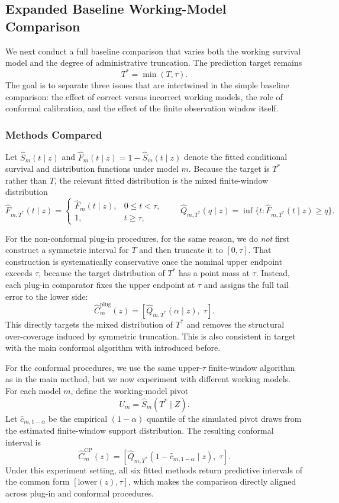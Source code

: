 \documentclass[12pt]{article}
\makeatletter
\let\thesis@section\subsection
\let\thesis@subsection\subsubsection
\renewcommand{\section}{\thesis@section}
\renewcommand{\subsection}{\thesis@subsection}
\makeatother
\begin{document}
\section{\texorpdfstring{\textcolor{revisionblue}{Expanded Baseline Working-Model Comparison}}{Expanded Baseline Working-Model Comparison}}
\label{sec:expanded_baseline_comparison}
{\color{revisionblue}
We next conduct a full baseline comparison that varies both the working survival model and the degree of administrative truncation. The prediction target remains
\[
T^*=\min(T,\tau).
\]
The goal is to separate three issues that are intertwined in the simple baseline comparison: the effect of correct versus incorrect working models, the role of conformal calibration, and the effect of the finite observation window itself.

\subsection{Methods Compared}
Let $\widehat S_m(t\mid z)$ and $\widehat F_m(t\mid z)=1-\widehat S_m(t\mid z)$ denote the fitted conditional survival and distribution functions under model $m$. Because the target is $T^*$ rather than $T$, the relevant fitted distribution is the mixed finite-window distribution
\[
\widehat F_{m,T^*}(t\mid z)
=
\begin{cases}
\widehat F_m(t\mid z), & 0\le t<\tau,\\
1, & t\ge \tau,
\end{cases}
\qquad
\widehat Q_{m,T^*}(q\mid z)
=
\inf\{t:\widehat F_{m,T^*}(t\mid z)\ge q\}.
\]

For the non-conformal plug-in procedures, for the same reason, we do \emph{not} first construct a symmetric interval for $T$ and then truncate it to $[0,\tau]$. That construction is systematically conservative once the nominal upper endpoint exceeds $\tau$, because the target distribution of $T^*$ has a point mass at $\tau$. Instead, each plug-in comparator fixes the upper endpoint at $\tau$ and assigns the full tail error to the lower side:
\[
\widehat C_m^{\mathrm{plug}}(z)
=
\left[
\widehat Q_{m,T^*}(\alpha\mid z),\;
\tau
\right].
\]
This directly targets the mixed distribution of $T^*$ and removes the structural over-coverage induced by symmetric truncation. This is also consistent in target with the main conformal algorithm with introduced before.

For the conformal procedures, we use the same upper-$\tau$ finite-window algorithm as in the main method, but we now experiment with different working models. For each model $m$, define the working-model pivot
\[
U_m=\widehat S_m(T^*\mid Z).
\]
Let $\widehat c_{m,1-\alpha}$ be the empirical $(1-\alpha)$ quantile of the simulated pivot draws from the estimated finite-window support distribution. The resulting conformal interval is
\[
\widehat C_m^{\mathrm{CP}}(z)
=
\left[
\widehat Q_{m,T^*}(1-\widehat c_{m,1-\alpha}\mid z),\;
\tau
\right].
\]
Under this experiment setting, all six fitted methods return predictive intervals of the common form
$[\text{lower}(z),\tau]$, which makes the comparison directly aligned across
plug-in and conformal procedures.

}
\end{document}
